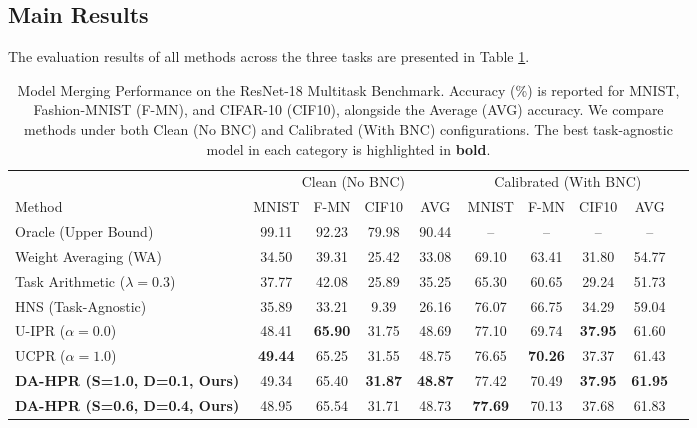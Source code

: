 \documentclass{article}
\theoremstyle{plain}
\theoremstyle{definition}
\theoremstyle{remark}
\begin{document}
\subsection{Main Results}

The evaluation results of all methods across the three tasks are presented in Table \ref{submission3:tab:results}.

\begin{table}[t]
\caption{Model Merging Performance on the ResNet-18 Multitask Benchmark. Accuracy (\%) is reported for MNIST, Fashion-MNIST (F-MN), and CIFAR-10 (CIF10), alongside the Average (AVG) accuracy. We compare methods under both Clean (No BNC) and Calibrated (With BNC) configurations. The best task-agnostic model in each category is highlighted in \textbf{bold}.}
\label{submission3:tab:results}
\vskip 0.15in
\begin{center}
\begin{small}
\begin{sc}
\begin{tabular}{lccccccccc}
\toprule
& \multicolumn{4}{c}{Clean (No BNC)} & \multicolumn{4}{c}{Calibrated (With BNC)} \\
\cmidrule(r){2-5} \cmidrule(l){6-9}
Method & MNIST & F-MN & CIF10 & AVG & MNIST & F-MN & CIF10 & AVG \\
\midrule
Oracle (Upper Bound) & 99.11 & 92.23 & 79.98 & 90.44 & -- & -- & -- & -- \\
\midrule
Weight Averaging (WA) & 34.50 & 39.31 & 25.42 & 33.08 & 69.10 & 63.41 & 31.80 & 54.77 \\
Task Arithmetic ($\lambda=0.3$) & 37.77 & 42.08 & 25.89 & 35.25 & 65.30 & 60.65 & 29.24 & 51.73 \\
HNS (Task-Agnostic) & 35.89 & 33.21 & 9.39 & 26.16 & 76.07 & 66.75 & 34.29 & 59.04 \\
\midrule
U-IPR ($\alpha=0.0$) & 48.41 & \textbf{65.90} & 31.75 & 48.69 & 77.10 & 69.74 & \textbf{37.95} & 61.60 \\
UCPR ($\alpha=1.0$) & \textbf{49.44} & 65.25 & 31.55 & 48.75 & 76.65 & \textbf{70.26} & 37.37 & 61.43 \\
\midrule
\textbf{DA-HPR (S=1.0, D=0.1, Ours)} & 49.34 & 65.40 & \textbf{31.87} & \textbf{48.87} & 77.42 & 70.49 & \textbf{37.95} & \textbf{61.95} \\
\textbf{DA-HPR (S=0.6, D=0.4, Ours)} & 48.95 & 65.54 & 31.71 & 48.73 & \textbf{77.69} & 70.13 & 37.68 & 61.83 \\
\bottomrule
\end{tabular}
\end{sc}
\end{small}
\end{center}
\vskip -0.1in
\end{table}
\end{document}
